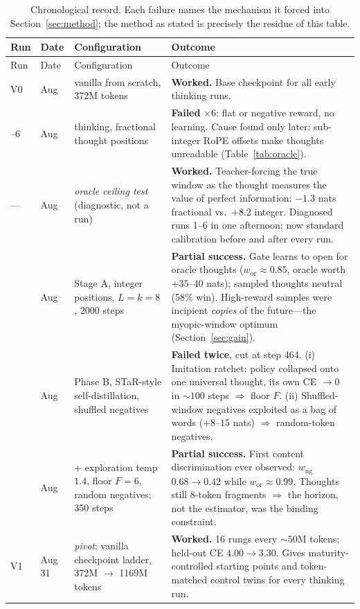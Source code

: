 \documentclass{article} %
\begin{document}
{\small
\begin{longtable}{@{}llp{3.6cm}p{5.6cm}@{}}
\caption{Chronological record. Each failure names the mechanism it forced into Section~\ref{sec:method}; the method as stated is precisely the residue of this table.}
\label{tab:history}\\
\toprule
Run & Date & Configuration & Outcome \\
\midrule
\endfirsthead
\toprule
Run & Date & Configuration & Outcome \\
\midrule
\endhead
\bottomrule
\endlastfoot
V0 & Aug & vanilla from scratch, 372M tokens & \textbf{Worked.} Base checkpoint for all early thinking runs. \\
\addlinespace
1--6 & Aug & thinking, fractional thought positions & \textbf{Failed} $\times 6$: flat or negative reward, no learning. Cause found only later: sub-integer RoPE offsets make thoughts unreadable (Table~\ref{tab:oracle}). \\
\addlinespace
--- & Aug & \emph{oracle ceiling test} (diagnostic, not a run) & \textbf{Worked.} Teacher-forcing the true window as the thought measures the value of perfect information: $-1.3$ nats fractional vs.\ $+8.2$ integer. Diagnosed runs 1--6 in one afternoon; now standard calibration before and after every run. \\
\addlinespace
7 & Aug & Stage A, integer positions, $L{=}k{=}8$, 2000 steps & \textbf{Partial success.} Gate learns to open for oracle thoughts ($w_{\mathrm{or}}{\approx}0.85$, oracle worth $+35$--$40$ nats); sampled thoughts neutral (58\% win). High-reward samples were incipient \emph{copies} of the future---the myopic-window optimum (Section~\ref{sec:gain}). \\
\addlinespace
8 & Aug & Phase B, STaR-style self-distillation, shuffled negatives & \textbf{Failed twice}, cut at step 464. (i) Imitation ratchet: policy collapsed onto one universal thought, its own CE $\to 0$ in ${\sim}100$ steps $\Rightarrow$ floor $F$. (ii) Shuffled-window negatives exploited as a bag of words ($+8$--$15$ nats) $\Rightarrow$ random-token negatives. \\
\addlinespace
9 & Aug & + exploration temp $1.4$, floor $F{=}6$, random negatives; 350 steps & \textbf{Partial success.} First content discrimination ever observed: $w_{\mathrm{ng}}$ $0.68 \to 0.42$ while $w_{\mathrm{or}} \approx 0.99$. Thoughts still 8-token fragments $\Rightarrow$ the horizon, not the estimator, was the binding constraint. \\
\addlinespace
V1 & Aug 31 & \emph{pivot}: vanilla checkpoint ladder, 372M $\to$ 1169M tokens & \textbf{Worked.} 16 rungs every ${\sim}50$M tokens; held-out CE $4.00 \to 3.30$. Gives maturity-controlled starting points and token-matched control twins for every thinking run. \\

\end{longtable}}
\end{document}
